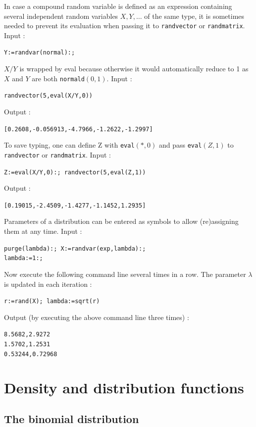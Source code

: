 \documentclass[a4paper,11pt]{book}
\begin{document}
In case a compound random variable is defined as an expression containing several independent random variables $X,Y,\dots$ of the same type, it is sometimes needed to prevent its evaluation when passing it to {\tt randvector} or {\tt randmatrix}. Input :
\begin{center}
  \tt Y:=randvar(normal):;
\end{center}
$X/Y$ is wrapped by eval because otherwise it would automatically reduce to 1 as $X$ and $Y$ are both {\tt normald}$(0,1)$. Input :
\begin{center}
  \tt randvector(5,eval(X/Y,0))
\end{center}
Output :
\begin{center}
  \tt [0.2608,-0.056913,-4.7966,-1.2622,-1.2997]
\end{center}
To save typing, one can define Z with {\tt eval}$(\ast,0)$ and pass {\tt eval}$(Z,1)$ to {\tt randvector} or {\tt randmatrix}. Input :
\begin{center}
  \tt Z:=eval(X/Y,0):; randvector(5,eval(Z,1))
\end{center}
Output :
\begin{center}
  \tt [0.19015,-2.4509,-1.4277,-1.1452,1.2935]
\end{center}
Parameters of a distribution can be entered as symbols to allow (re)assigning them at any time. Input :
\begin{center}
  \tt purge(lambda):; X:=randvar(exp,lambda):;\\lambda:=1:;
\end{center}
Now execute the following command line several times in a row. The parameter $\lambda$ is updated in each iteration :
\begin{center}
  \tt r:=rand(X); lambda:=sqrt(r)
\end{center}
Output (by executing the above command line three times) :
\begin{center}
  \tt 8.5682,2.9272\\1.5702,1.2531\\0.53244,0.72968
\end{center}

\section{Density and distribution functions}

\subsection{The binomial distribution}
\end{document}
